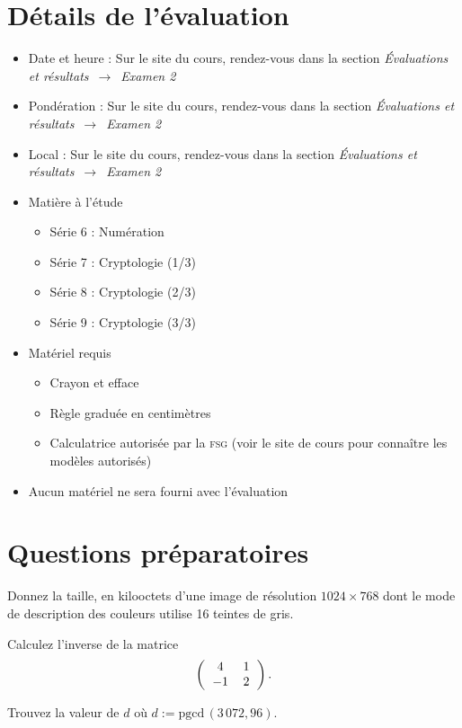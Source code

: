 \documentclass{Preparation}
\begin{document}
\pagecouverture
\section{Détails de l'évaluation}
\begin{itemize}
	\item Date et heure : Sur le site du cours, rendez-vous dans la section \textit{Évaluations et résultats}~$\rightarrow$~\textit{Examen 2}
	\item Pondération : Sur le site du cours, rendez-vous dans la section \textit{Évaluations et résultats}~$\rightarrow$~\textit{Examen 2}
	\item Local : Sur le site du cours, rendez-vous dans la section \textit{Évaluations et résultats}~$\rightarrow$~\textit{Examen 2}
	\item Matière à l'étude
		\begin{itemize}
			\item Série 6 : Numération
			\item Série 7 : Cryptologie (1/3)
			\item Série 8 : Cryptologie (2/3)
			\item Série 9 : Cryptologie (3/3)
		\end{itemize}
    \item Matériel requis
		\begin{itemize}
			\item Crayon et efface
			\item Règle graduée en centimètres
            \item Calculatrice autorisée par la \textsc{fsg} (voir le site de cours pour connaître les modèles autorisés)
		\end{itemize}
	\item Aucun matériel ne sera fourni avec l'évaluation
\end{itemize}
\newpage
\section{Questions préparatoires}
\begin{question}
   Donnez la taille, en kilooctets d'une image de résolution $1024\times 768$ dont le mode de description des couleurs utilise 16 teintes de gris.
\end{question}
\begin{question}
  Calculez l'inverse de la matrice
  \[\left(
  			\begin{tabular}{cc}
  				$4$ & $1$\\
  				$-1$ & $2$
  			\end{tabular}
  			\right).
  \]
  \end{question}
  \begin{question}
   Trouvez la valeur de $d$ où $d:=\textrm{pgcd}\,(3\,072, 96)$.
   \end{question}
    
\end{document}
